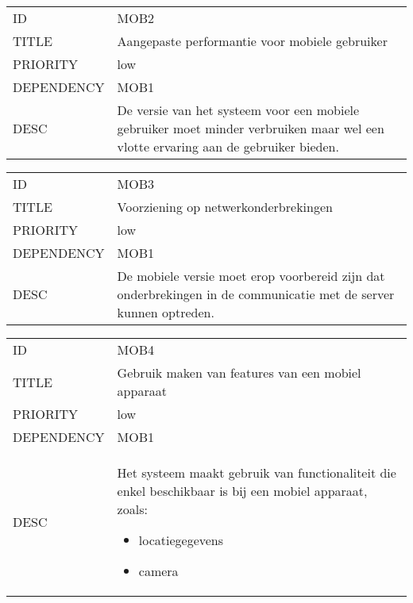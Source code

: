 \begin{longtable}{lp{10cm}}
ID           & MOB2\\
TITLE        & Aangepaste performantie voor mobiele gebruiker\\
PRIORITY     & low\\
DEPENDENCY   & MOB1\\
DESC         & De versie van het systeem voor een mobiele gebruiker moet minder verbruiken maar wel een vlotte ervaring aan de gebruiker bieden.
\end{longtable}

\begin{longtable}{lp{10cm}}
ID           & MOB3\\
TITLE        & Voorziening op netwerkonderbrekingen\\
PRIORITY     & low\\
DEPENDENCY   & MOB1\\
DESC         & De mobiele versie moet erop voorbereid zijn dat onderbrekingen in de communicatie met de server kunnen optreden.
\end{longtable}

\begin{longtable}{lp{10cm}}
ID           & MOB4\\
TITLE        & Gebruik maken van features van een mobiel apparaat\\
PRIORITY     & low\\
DEPENDENCY   & MOB1\\
DESC         & Het systeem maakt gebruik van functionaliteit die enkel beschikbaar is bij een mobiel apparaat, zoals:
\begin{itemize}
\item locatiegegevens
\item camera
\end{itemize}  
\end{longtable}